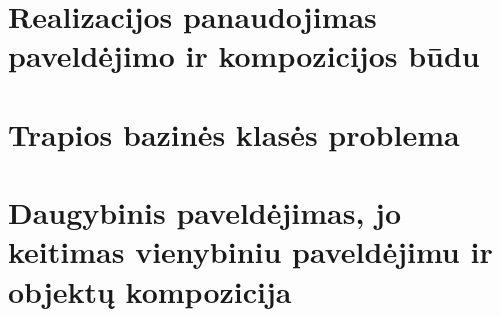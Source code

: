 
\section{Realizacijos panaudojimas paveldėjimo ir kompozicijos būdu}

\cite{martin2003agile}

\section{Trapios bazinės klasės problema}

\cite{mikhajlov1997fragile}

\section{Daugybinis paveldėjimas, jo keitimas vienybiniu paveldėjimu ir
objektų kompozicija}

